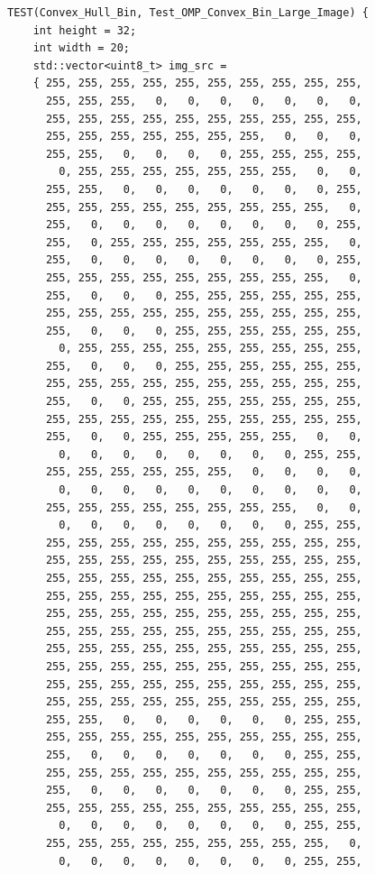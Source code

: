 \documentclass{report}
\begin{document}
\begin{lstlisting}
TEST(Convex_Hull_Bin, Test_OMP_Convex_Bin_Large_Image) {
    int height = 32;
    int width = 20;
    std::vector<uint8_t> img_src =
    { 255, 255, 255, 255, 255, 255, 255, 255, 255, 255,
      255, 255, 255,   0,   0,   0,   0,   0,   0,   0,
      255, 255, 255, 255, 255, 255, 255, 255, 255, 255,
      255, 255, 255, 255, 255, 255, 255,   0,   0,   0,
      255, 255,   0,   0,   0,   0, 255, 255, 255, 255,
        0, 255, 255, 255, 255, 255, 255, 255,   0,   0,
      255, 255,   0,   0,   0,   0,   0,   0,   0, 255,
      255, 255, 255, 255, 255, 255, 255, 255, 255,   0,
      255,   0,   0,   0,   0,   0,   0,   0,   0, 255,
      255,   0, 255, 255, 255, 255, 255, 255, 255,   0,
      255,   0,   0,   0,   0,   0,   0,   0,   0, 255,
      255, 255, 255, 255, 255, 255, 255, 255, 255,   0,
      255,   0,   0,   0, 255, 255, 255, 255, 255, 255,
      255, 255, 255, 255, 255, 255, 255, 255, 255, 255,
      255,   0,   0,   0, 255, 255, 255, 255, 255, 255,
        0, 255, 255, 255, 255, 255, 255, 255, 255, 255,
      255,   0,   0,   0, 255, 255, 255, 255, 255, 255,
      255, 255, 255, 255, 255, 255, 255, 255, 255, 255,
      255,   0,   0, 255, 255, 255, 255, 255, 255, 255,
      255, 255, 255, 255, 255, 255, 255, 255, 255, 255,
      255,   0,   0, 255, 255, 255, 255, 255,   0,   0,
        0,   0,   0,   0,   0,   0,   0,   0, 255, 255,
      255, 255, 255, 255, 255, 255,   0,   0,   0,   0,
        0,   0,   0,   0,   0,   0,   0,   0,   0,   0,
      255, 255, 255, 255, 255, 255, 255, 255,   0,   0,
        0,   0,   0,   0,   0,   0,   0,   0, 255, 255,
      255, 255, 255, 255, 255, 255, 255, 255, 255, 255,
      255, 255, 255, 255, 255, 255, 255, 255, 255, 255,
      255, 255, 255, 255, 255, 255, 255, 255, 255, 255,
      255, 255, 255, 255, 255, 255, 255, 255, 255, 255,
      255, 255, 255, 255, 255, 255, 255, 255, 255, 255,
      255, 255, 255, 255, 255, 255, 255, 255, 255, 255,
      255, 255, 255, 255, 255, 255, 255, 255, 255, 255,
      255, 255, 255, 255, 255, 255, 255, 255, 255, 255,
      255, 255, 255, 255, 255, 255, 255, 255, 255, 255,
      255, 255, 255, 255, 255, 255, 255, 255, 255, 255,
      255, 255,   0,   0,   0,   0,   0,   0, 255, 255,
      255, 255, 255, 255, 255, 255, 255, 255, 255, 255,
      255,   0,   0,   0,   0,   0,   0,   0, 255, 255,
      255, 255, 255, 255, 255, 255, 255, 255, 255, 255,
      255,   0,   0,   0,   0,   0,   0,   0, 255, 255,
      255, 255, 255, 255, 255, 255, 255, 255, 255, 255,
        0,   0,   0,   0,   0,   0,   0,   0, 255, 255,
      255, 255, 255, 255, 255, 255, 255, 255, 255,   0,
        0,   0,   0,   0,   0,   0,   0,   0, 255, 255,

\end{lstlisting}
\end{document}
